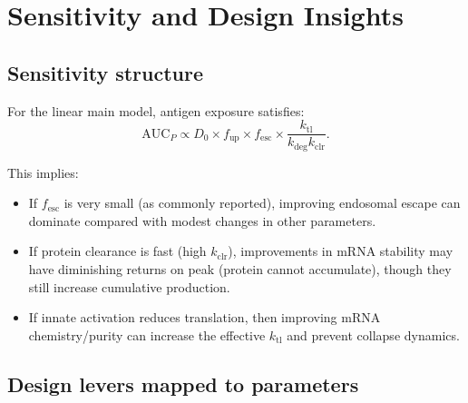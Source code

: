 \section{Sensitivity and Design Insights}

\subsection*{Sensitivity structure}

For the linear main model, antigen exposure satisfies:
\begin{equation}
\mathrm{AUC}_P \propto D_0 \times f_{\mathrm{up}} \times f_{\mathrm{esc}} \times \frac{k_{\mathrm{tl}}}{k_{\mathrm{deg}}k_{\mathrm{clr}}}.
\end{equation}

This implies:
\begin{itemize}
    \item If $f_{\mathrm{esc}}$ is very small (as commonly reported), improving endosomal escape can dominate compared with modest changes in other parameters.
    \item If protein clearance is fast (high $k_{\mathrm{clr}}$), improvements in mRNA stability may have diminishing returns on peak (protein cannot accumulate), though they still increase cumulative production.
    \item If innate activation reduces translation, then improving mRNA chemistry/purity can increase the effective $k_{\mathrm{tl}}$ and prevent collapse dynamics.
\end{itemize}

\subsection*{Design levers mapped to parameters}

